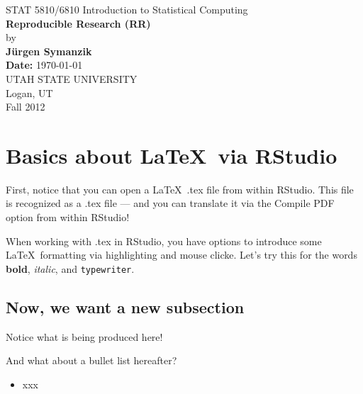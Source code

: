 \documentclass[12pt]{article}
\begin{document}
\begin{titlepage}

\begin{center}
{\large STAT 5810/6810 Introduction to Statistical Computing} \\[4cm]

{\LARGE \bf Reproducible Research (RR)} \\[1cm]
by \\[0.5cm]
{\bf J\"urgen Symanzik} \\[2.5cm]
{\bf Date:} \today \\[2cm]

UTAH STATE UNIVERSITY \\[0.5cm]
Logan, UT \\[0.5cm]
Fall 2012 \\[0.5cm]
\end{center}

\thispagestyle{empty}
\vfill
\end{titlepage}


\newpage 



\tableofcontents


\newpage



\section{Basics about \LaTeX\ via RStudio}

First, notice that you can open a \LaTeX\ .tex file from within RStudio.
This file is recognized as a .tex file --- and you can translate it 
via the Compile PDF option from within RStudio!

When working with .tex in RStudio, you have options to introduce
some \LaTeX\ formatting via highlighting and mouse clicke. Let's
try this for the words \textbf{bold}, \emph{italic}, and \texttt{typewriter}.


\subsection*{Now, we want a new subsection}

Notice what is being produced here!



And what about a bullet list hereafter?
\begin{itemize}
  \item xxx
\end{itemize}
\end{document}
